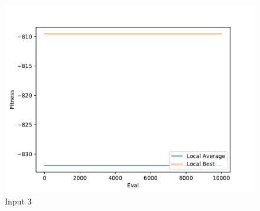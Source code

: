 \documentclass{standalone}
\begin{document}
\begin{figure}[!htb]
	\caption{Input 3}
	\label{fig:graph_3052}
	\includegraphics[width=\textwidth]{../graphs/graphs/3052.pdf}
\end{figure}
\end{document}
